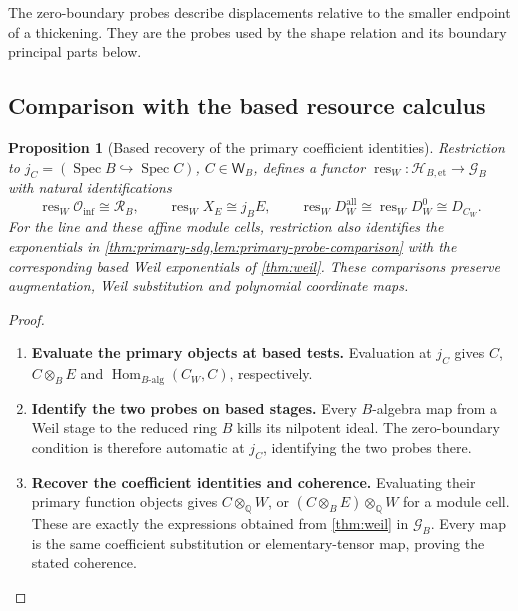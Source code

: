 \documentclass[11pt,a4paper]{article}
\numberwithin{algorithm}{section}
\numberwithin{equation}{section}
\newtheorem{proposition}[proposition]{Proposition}
\theoremstyle{definition}
\theoremstyle{remark}
\theoremstyle{plain}
\newcommand{\QQ}{\mathbb Q}
\newcommand{\Hom}{\operatorname{Hom}}
\newcommand{\Weil}{\mathsf W}
\newcommand{\Geo}{\mathcal G_B}
\newcommand{\Rline}{\mathcal R_B}
\newcommand{\ThickEt}{\mathscr H_{B,\mathrm{et}}}
\theoremstyle{definition}
\theoremstyle{plain}
\begin{document}
The zero-boundary probes describe displacements relative to the
smaller endpoint of a thickening.  They are the probes used by the
shape relation and its boundary principal parts below.

\subsection{Comparison with the based resource calculus}
\begin{proposition}[Based recovery of the primary coefficient identities]
\label{prop:sdg-based-recovery}
Restriction to $j_C=(\operatorname{Spec}B\hookrightarrow
\operatorname{Spec}C)$, $C\in\Weil_B$, defines a functor
$\operatorname{res}_W:\ThickEt\to\Geo$ with natural identifications
\[
 \operatorname{res}_W\mathcal O_{\mathrm{inf}}\cong\Rline,
 \qquad \operatorname{res}_WX_E\cong j_BE,
 \qquad
 \operatorname{res}_WD_W^{\mathrm{all}}
 \cong\operatorname{res}_WD_W^0\cong D_{C_W}.
\]
For the line and these affine module cells, restriction also identifies
the exponentials in \cref{thm:primary-sdg,lem:primary-probe-comparison}
with the corresponding based Weil exponentials of \cref{thm:weil}.
These comparisons preserve augmentation, Weil substitution and
polynomial coordinate maps.
\end{proposition}
\begin{proof}\leavevmode
\begin{enumerate}[leftmargin=*,align=left]
\item \textbf{Evaluate the primary objects at based tests.}
Evaluation at $j_C$ gives $C$, $C\otimes_BE$ and
$\Hom_{B\text{-alg}}(C_W,C)$, respectively.

\item \textbf{Identify the two probes on based stages.}
Every $B$-algebra map from a
Weil stage to the reduced ring $B$ kills its nilpotent ideal.
The zero-boundary condition is therefore automatic at $j_C$,
identifying the two probes there.

\item \textbf{Recover the coefficient identities and coherence.}
Evaluating their primary
function objects gives $C\otimes_\QQ W$, or
$(C\otimes_BE)\otimes_\QQ W$ for a module cell.  These are
exactly the expressions obtained from \cref{thm:weil} in $\Geo$.
Every map is the same coefficient substitution or elementary-tensor
map, proving the stated coherence.
\end{enumerate}
\end{proof}
\end{document}
